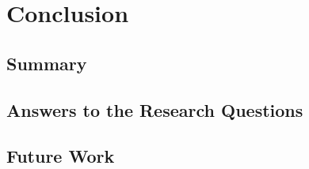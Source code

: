\chapter{Conclusion}\label{ch:conclusion}
\section{Summary}\label{sec:conc:summary}
\section{Answers to the Research Questions}\label{sec:conc:rqs}
\section{Future Work}\label{sec:conc:future}

